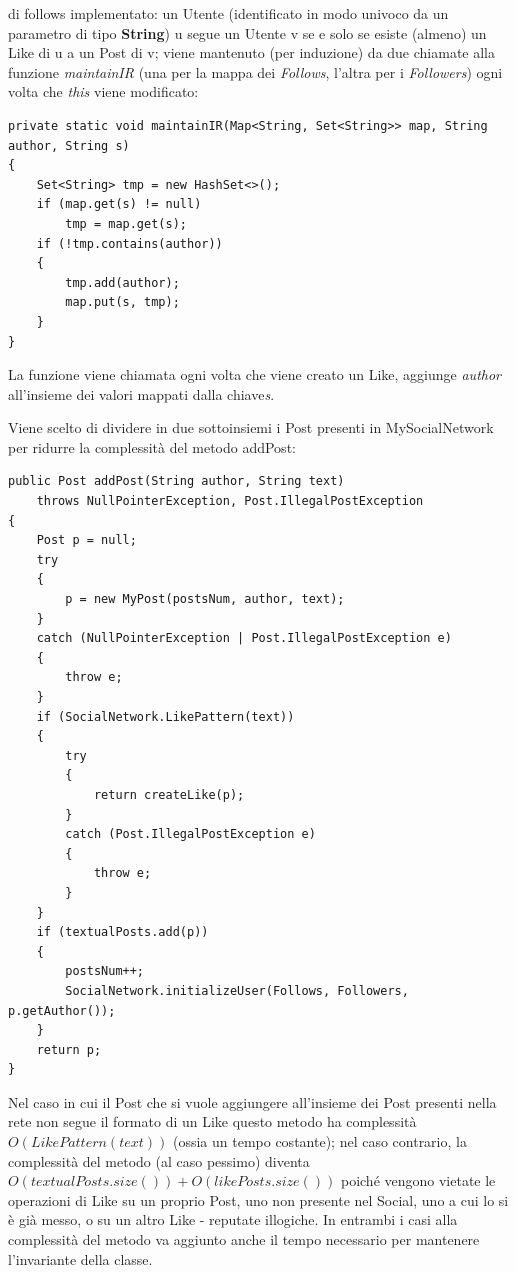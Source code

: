 \documentclass[10pt, italian, openany]{book}
\begin{document}
di follows implementato: un Utente (identificato in modo univoco da un parametro di tipo \textbf{String}) u segue un Utente v se e solo se 
esiste (almeno) un Like di u a un Post di v; viene mantenuto (per induzione) da due chiamate alla funzione \textit{maintainIR} (una per la mappa dei \textit{Follows}, l'altra per i \textit{Followers}) ogni volta che \textit{this} viene modificato:
\begin{lstlisting}[style=codeStyle]
private static void maintainIR(Map<String, Set<String>> map, String author, String s)
{
    Set<String> tmp = new HashSet<>();
    if (map.get(s) != null)
        tmp = map.get(s);
    if (!tmp.contains(author))
    {
        tmp.add(author);
        map.put(s, tmp);
    }
}
\end{lstlisting}
La funzione viene chiamata ogni volta che viene creato un Like, aggiunge \textit{author} all'insieme dei valori mappati dalla chiave\textit{s}.

Viene scelto di dividere in due sottoinsiemi i Post presenti in MySocialNetwork per ridurre la complessit\`a del metodo addPost:
\begin{lstlisting}[style=codeStyle]
public Post addPost(String author, String text)
    throws NullPointerException, Post.IllegalPostException
{
    Post p = null;
    try
    {
        p = new MyPost(postsNum, author, text);
    }
    catch (NullPointerException | Post.IllegalPostException e)
    {
        throw e;
    }
    if (SocialNetwork.LikePattern(text))
    {
        try
        {
            return createLike(p);
        }
        catch (Post.IllegalPostException e)
        {
            throw e;
        }
    }
    if (textualPosts.add(p))
    {
        postsNum++;
        SocialNetwork.initializeUser(Follows, Followers, p.getAuthor());
    }
    return p;
}
\end{lstlisting}
Nel caso in cui il Post che si vuole aggiungere all'insieme dei Post presenti nella rete non segue il formato di un Like questo metodo ha complessit\`a \( O(LikePattern(text))\) 
(ossia un tempo costante); nel caso contrario, la complessit\`a del metodo (al caso pessimo) diventa \(O(textualPosts.size()) + O(likePosts.size())\) 
poich\'e vengono vietate le operazioni di Like su un proprio Post, uno non presente nel Social, uno a cui lo si \`e gi\`a messo, o su un altro Like - reputate illogiche.
In entrambi i casi alla complessit\`a del metodo va aggiunto anche il tempo necessario per mantenere l'invariante della classe.
\end{document}
